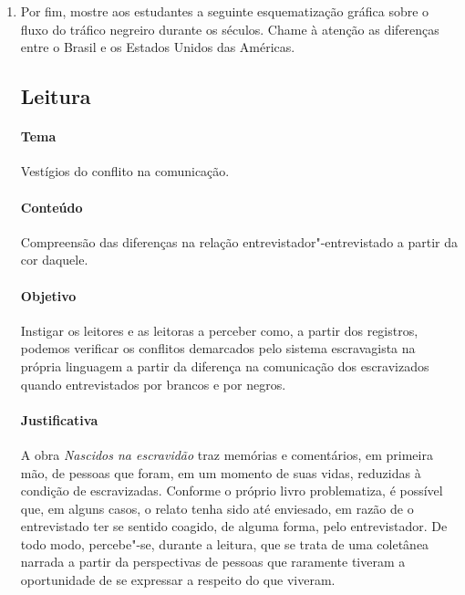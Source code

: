 \documentclass[11pt]{extarticle}
\begin{document}
\begin{enumerate}
  \item 
  Por fim, mostre aos estudantes a seguinte esquematização gráfica sobre o fluxo do tráfico negreiro
  durante os séculos. Chame à atenção as diferenças entre o Brasil e os Estados Unidos das Américas.


\subsection{Leitura}


\paragraph{Tema} Vestígios do conflito na comunicação.

\paragraph{Conteúdo} Compreensão das diferenças na relação entrevistador"-entrevistado
a partir da cor daquele.

\paragraph{Objetivo} Instigar os leitores e as leitoras a perceber como, a partir dos registros,
podemos verificar os conflitos demarcados pelo sistema escravagista na própria linguagem a partir
da diferença na comunicação dos escravizados quando entrevistados por brancos e por negros.

\paragraph{Justificativa} A obra \emph{Nascidos na escravidão} traz memórias e
comentários, em primeira mão, de pessoas que foram, em um momento de
suas vidas, reduzidas à condição de escravizadas. Conforme o próprio
livro problematiza, é possível que, em alguns casos, o relato tenha sido
até enviesado, em razão de o entrevistado ter se sentido coagido, de
alguma forma, pelo entrevistador. De todo modo, percebe"-se, durante a
leitura, que se trata de uma coletânea narrada a partir da perspectivas
de pessoas que raramente tiveram a oportunidade de se expressar a
respeito do que viveram.


\end{enumerate}
\end{document}
